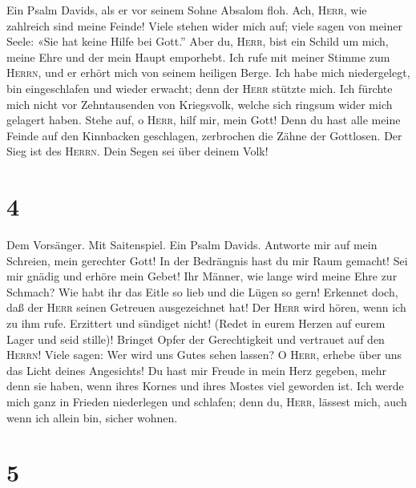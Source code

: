  Ein Psalm Davids, als er vor seinem Sohne Absalom floh.
Ach, \textsc{Herr}, wie zahlreich sind meine Feinde! Viele stehen wider
mich auf;  viele sagen von meiner Seele: «Sie hat keine
Hilfe bei Gott.''  Aber du, \textsc{Herr}, bist ein Schild
um mich, meine Ehre und der mein Haupt emporhebt.  Ich
rufe mit meiner Stimme zum \textsc{Herrn}, und er erhört mich von seinem
heiligen Berge.  Ich habe mich niedergelegt, bin
eingeschlafen und wieder erwacht; denn der \textsc{Herr} stützte mich.
 Ich fürchte mich nicht vor Zehntausenden von Kriegsvolk,
welche sich ringsum wider mich gelagert haben.  Stehe auf,
o \textsc{Herr}, hilf mir, mein Gott! Denn du hast alle meine Feinde auf
den Kinnbacken geschlagen, zerbrochen die Zähne der Gottlosen.
 Der Sieg ist des \textsc{Herrn}. Dein Segen sei über
deinem Volk!

\hypertarget{section-3}{%
\section{4}\label{section-3}}

 Dem Vorsänger. Mit Saitenspiel. Ein Psalm Davids.
Antworte mir auf mein Schreien, mein gerechter Gott! In der Bedrängnis
hast du mir Raum gemacht! Sei mir gnädig und erhöre mein Gebet!
 Ihr Männer, wie lange wird meine Ehre zur Schmach? Wie
habt ihr das Eitle so lieb und die Lügen so gern! 
Erkennet doch, daß der \textsc{Herr} seinen Getreuen ausgezeichnet hat!
Der \textsc{Herr} wird hören, wenn ich zu ihm rufe. 
Erzittert und sündiget nicht! (Redet in eurem Herzen auf eurem Lager und
seid stille)!  Bringet Opfer der Gerechtigkeit und
vertrauet auf den \textsc{Herrn}!  Viele sagen: Wer wird
uns Gutes sehen lassen? O \textsc{Herr}, erhebe über uns das Licht
deines Angesichts!  Du hast mir Freude in mein Herz
gegeben, mehr denn sie haben, wenn ihres Kornes und ihres Mostes viel
geworden ist.  Ich werde mich ganz in Frieden niederlegen
und schlafen; denn du, \textsc{Herr}, lässest mich, auch wenn ich allein
bin, sicher wohnen.

\hypertarget{section-4}{%
\section{5}\label{section-4}}

